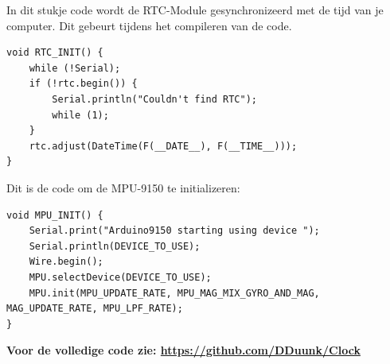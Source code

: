 \documentclass[a4paper,12pt]{article}
\begin{document}
In dit stukje code wordt de RTC-Module gesynchronizeerd met de tijd van je computer. 
Dit gebeurt tijdens het compileren van de code.
\begin{lstlisting}[caption=RTC.cpp]
void RTC_INIT() {
    while (!Serial);
    if (!rtc.begin()) {
        Serial.println("Couldn't find RTC");
        while (1);
    }
    rtc.adjust(DateTime(F(__DATE__), F(__TIME__)));
}
\end{lstlisting}
Dit is de code om de MPU-9150 te initializeren:
\begin{lstlisting}[caption=MPU.cpp]
void MPU_INIT() {
    Serial.print("Arduino9150 starting using device "); 
    Serial.println(DEVICE_TO_USE);
    Wire.begin();
    MPU.selectDevice(DEVICE_TO_USE);
    MPU.init(MPU_UPDATE_RATE, MPU_MAG_MIX_GYRO_AND_MAG, MAG_UPDATE_RATE, MPU_LPF_RATE); 
}
\end{lstlisting}
\textbf{Voor de volledige code zie: \url{https://github.com/DDuunk/Clock} }
\end{document}
